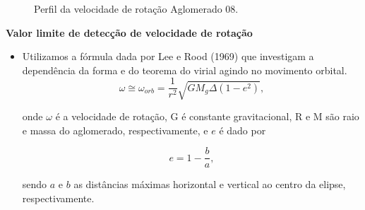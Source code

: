 \documentclass[xcolor=dvipsnames,10pt]{beamer}
\begin{document}
\begin{frame}
  \begin{figure}[!htbp] %
  \vspace{-2pt}
  \begin{center}
  \caption{Perfil da velocidade de rotação Aglomerado 08.}
  \label{fig6}%
  \end{center}
  \end{figure}
\end{frame}

\begin{frame}
  \begin{block}{{\textbf{Valor limite de detecção de velocidade de rotação}}}
    \begin{itemize}
      \item  Utilizamos a fórmula dada por Lee e Rood (1969) que investigam a dependência da forma e do teorema do virial agindo no movimento orbital.
      \begin{equation}
        \omega \cong \omega_{orb} = \frac{1}{r^2} \sqrt{G M_g \Delta (1 - e^2)}, 
        \label{eq:maxRotacao}
      \end{equation}
  
        \noindent onde $\omega$ é a velocidade de rotação, G é constante gravitacional, R e M são raio e massa do aglomerado, respectivamente, e $e$ é dado por 

        \begin{equation}
        e = 1 - \frac{b}{a}, 
        \label{eq:exce}
\end{equation}

\noindent sendo $a$ e $b$ as distâncias máximas horizontal e vertical ao centro da elipse, respectivamente.
    \end{itemize}
  \end{block}
\end{frame}
\end{document}
